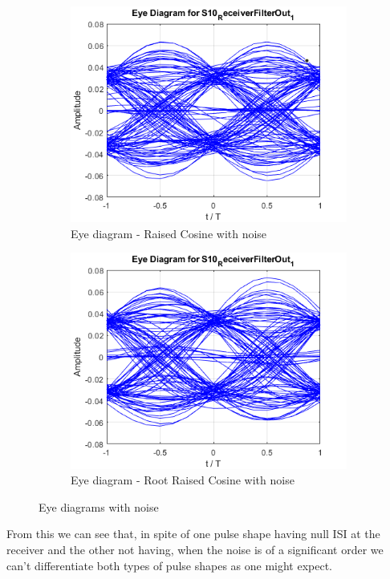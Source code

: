 \begin{figure}[H]
	\centering
        \begin{subfigure}{.55\textwidth}
        \centering
        	\includegraphics[scale=0.45]{./lib/m_qam_transmitter/figures/eye_dgm_noise_rcos.png}
            \caption{Eye diagram - Raised Cosine with noise}
            \label{noise_rcos}
        \end{subfigure}%
        \begin{subfigure}{.55\textwidth}
        \centering
        	\includegraphics[scale=0.45]{./lib/m_qam_transmitter/figures/eye_dgm_noise_rrcos.png}
        	\caption{Eye diagram - Root Raised Cosine with noise}
            \label{noise_rrcos}
        \end{subfigure}
        \caption{Eye diagrams with noise}%
\end{figure}
From this we can see that, in spite of one pulse shape having null ISI at the receiver and the other not having, when the noise is of a significant order we can't differentiate both types of pulse shapes as one might expect.


